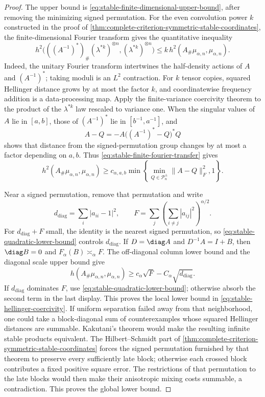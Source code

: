\begin{proof}
The upper bound is \eqref{eq:stable-finite-dimensional-upper-bound}, after
removing the minimizing signed permutation.
For the even convolution power \(k\) constructed in the proof of
\cref{thm:complete-criterion-symmetric-stable-coordinates}, the
finite-dimensional Fourier transform gives the quantitative inequality
\begin{equation}
 h^2\bigl(((A^{-1})^*)_\#(\lambda^{*k})^{\otimes n},
                 (\lambda^{*k})^{\otimes n}\bigr)
 \le k\,h^2(A_\#\mu_{\alpha,n},\mu_{\alpha,n}).
 \label{eq:stable-finite-fourier-transfer}
\end{equation}
Indeed, the unitary Fourier transform intertwines the half-density actions
of \(A\) and \((A^{-1})^*\); taking moduli is an \(L^2\) contraction.
For \(k\) tensor copies, squared Hellinger distance grows by at most the
factor \(k\), and coordinatewise frequency addition is a data-processing
map.
Apply the finite-variance coercivity theorem to the product of the
\(\lambda^{*k}\) law rescaled to variance one.
When the singular values of \(A\) lie in \([a,b]\), those of \((A^{-1})^*\)
lie in \([b^{-1},a^{-1}]\), and
\[
 A-Q=-A\bigl((A^{-1})^*-Q\bigr)^*Q
\]
shows that distance from the signed-permutation group changes by at most a
factor depending on \(a,b\).
Thus \eqref{eq:stable-finite-fourier-transfer} gives
\begin{equation}
 h^2(A_\#\mu_{\alpha,n},\mu_{\alpha,n})
 \ge c_{\alpha,a,b}
     \min\left\{\min_{Q\in\mathcal P_n^{\pm}}\|A-Q\|_F^2,1\right\}.
 \label{eq:stable-quadratic-lower-bound}
\end{equation}

Near a signed permutation, remove that permutation and write
\[
 d_{\mathrm{diag}}=\sum_i|a_{ii}-1|^2,
 \qquad
 F=\sum_j\left(\sum_{i\ne j}|a_{ij}|^2\right)^{\alpha/2}.
\]
For \(d_{\mathrm{diag}}+F\) small, the identity is the nearest signed
permutation, so \eqref{eq:stable-quadratic-lower-bound} controls
\(d_{\mathrm{diag}}\).
If \(D=\diag A\) and \(D^{-1}A=I+B\), then
\(\diag B=0\) and \(F_\alpha(B)\asymp_\alpha F\).
The off-diagonal column lower bound and the diagonal scale upper bound give
\[
 h(A_\#\mu_{\alpha,n},\mu_{\alpha,n})
 \ge c_\alpha\sqrt F-C_\alpha\sqrt{d_{\mathrm{diag}}}.
\]
If \(d_{\mathrm{diag}}\) dominates \(F\), use
\eqref{eq:stable-quadratic-lower-bound}; otherwise absorb the second term in
the last display.
This proves the local lower bound in
\eqref{eq:stable-hellinger-coercivity}.
If uniform separation failed away from that neighborhood, one could take a
block-diagonal sum of counterexamples whose squared Hellinger distances are
summable.
Kakutani's theorem would make the resulting infinite stable products
equivalent.
The Hilbert--Schmidt part of
\cref{thm:complete-criterion-symmetric-stable-coordinates} forces the signed
permutation furnished by that theorem to preserve every sufficiently late block;
otherwise each crossed block contributes a fixed positive square error.
The restrictions of that permutation to the late blocks would then make
their anisotropic mixing costs summable, a contradiction.
This proves the global lower bound.
\end{proof}

